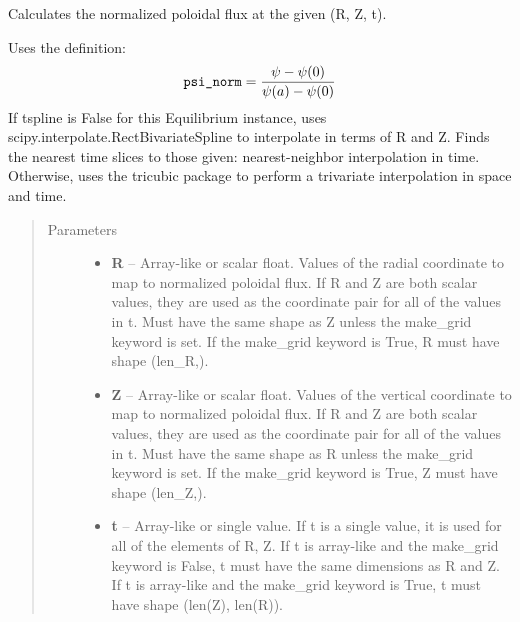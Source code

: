 \documentclass[letterpaper,10pt,english]{sphinxmanual}
\begin{document}
\begin{fulllineitems}
\begin{fulllineitems}
\end{fulllineitems}


\begin{fulllineitems}
\label{eqtools:eqtools.core.Equilibrium.rz2psinorm}
Calculates the normalized poloidal flux at the given (R, Z, t).

Uses the definition:
\begin{gather}
\begin{split}\texttt{psi\_norm} = \frac{\psi - \psi(0)}{\psi(a) - \psi(0)}\end{split}\notag
\end{gather}
If tspline is False for this Equilibrium instance, uses
scipy.interpolate.RectBivariateSpline to interpolate in terms of R and
Z. Finds the nearest time slices to those given: nearest-neighbor
interpolation in time. Otherwise, uses the tricubic package to perform
a trivariate interpolation in space and time.
\begin{quote}\begin{description}
\item[{Parameters }] \leavevmode\begin{itemize}
\item {} 
\textbf{R} --
Array-like or scalar float.
Values of the radial coordinate to
map to normalized poloidal flux. If R and Z are both scalar
values, they are used as the coordinate pair for all of the
values in t. Must have the same shape as Z unless the make\_grid
keyword is set. If the make\_grid keyword is True, R must have
shape (len\_R,).

\item {} 
\textbf{Z} --
Array-like or scalar float.
Values of the vertical coordinate to
map to normalized poloidal flux. If R and Z are both scalar
values, they are used as the coordinate pair for all of the
values in t. Must have the same shape as R unless the make\_grid
keyword is set. If the make\_grid keyword is True, Z must have
shape (len\_Z,).

\item {} 
\textbf{t} --
Array-like or single value.
If t is a single value, it is used
for all of the elements of R, Z. If t is array-like and the
make\_grid keyword is False, t must have the same dimensions as
R and Z. If t is array-like and the make\_grid keyword is True,
t must have shape (len(Z), len(R)).


\end{itemize}
\end{description}
\end{quote}
\end{fulllineitems}
\end{fulllineitems}
\end{document}
